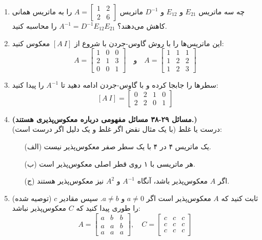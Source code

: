 \documentclass[12pt, a4paper]{book}
\begin{document}
\begin{enumerate}
		\item چه سه ماتریس $E_{21}$ و $E_{12}$ و $D^{-1}$ ماتریس $A=\begin{bmatrix} 1 & 2 \\ 2 & 6 \end{bmatrix}$ را به ماتریس همانی کاهش می‌دهند؟ $A^{-1}=D^{-1}E_{12}E_{21}$ را محاسبه کنید.
		
		\item این ماتریس‌ها را با روش گاوس-جردن با شروع از $[A \ I]$ معکوس کنید:
		\[ A = \begin{bmatrix} 1 & 0 & 0 \\ 2 & 1 & 3 \\ 0 & 0 & 1 \end{bmatrix} \quad \text{و} \quad A = \begin{bmatrix} 1 & 1 & 1 \\ 1 & 2 & 2 \\ 1 & 2 & 3 \end{bmatrix} \]
		
		\item سطرها را جابجا کرده و با گاوس-جردن ادامه دهید تا $A^{-1}$ را پیدا کنید:
		\[ [A \ I] = \left[ \begin{array}{cc|cc} 0 & 2 & 1 & 0 \\ 2 & 2 & 0 & 1 \end{array} \right] \]
		
		\item \textbf{(مسائل ۲۹-۳۸ مسائل مفهومی درباره معکوس‌پذیری هستند.)}\\
		درست یا غلط (با یک مثال نقض اگر غلط و یک دلیل اگر درست است):
		\begin{itemize}
			\item[(الف)] یک ماتریس ۴ در ۴ با یک سطر صفر معکوس‌پذیر نیست.
			\item[(ب)] هر ماتریسی با ۱ روی قطر اصلی معکوس‌پذیر است.
			\item[(ج)] اگر $A$ معکوس‌پذیر باشد، آنگاه $A^{-1}$ و $A^2$ نیز معکوس‌پذیر هستند.
		\end{itemize}
		
		\item (توصیه شده) ثابت کنید که $A$ معکوس‌پذیر است اگر $a \neq 0$ و $a \neq b$. سپس مقادیر $c$ را طوری پیدا کنید که $C$ معکوس‌پذیر نباشد:
		\[ A = \begin{bmatrix} a & b & b \\ a & a & b \\ a & a & a \end{bmatrix}, \quad C = \begin{bmatrix} c & c & c \\ c & c & c \\ c & c & c \end{bmatrix} \]
		

\end{enumerate}
\end{document}
